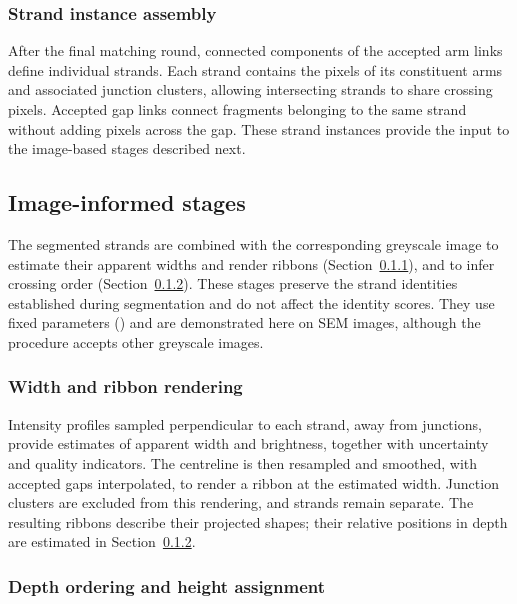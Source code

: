 \subsubsection{Strand instance assembly}
\label{sec:mm-output}

After the final matching round, connected components of the accepted arm
links define individual strands. Each strand contains the pixels of its
constituent arms and associated junction clusters, allowing intersecting
strands to share crossing pixels. Accepted gap links connect fragments
belonging to the same strand without adding pixels across the gap. These
strand instances provide the input to the image-based stages described next.

\subsection{Image-informed stages}
\label{sec:mm-image}

The segmented strands are combined with the corresponding greyscale image
to estimate their apparent widths and render ribbons
(Section~\ref{sec:mm-stage4}), and to infer crossing order
(Section~\ref{sec:mm-depth}).
These stages preserve the strand identities established during segmentation
and do not affect the identity scores. They use fixed parameters
(\supprecon{}) and are demonstrated here on SEM images, although the procedure
accepts other greyscale images.

\subsubsection{Width and ribbon rendering}
\label{sec:mm-stage4}

Intensity profiles sampled perpendicular to each strand, away from junctions,
provide estimates of apparent width and brightness, together with uncertainty
and quality indicators. The centreline is then resampled and smoothed, with
accepted gaps interpolated, to render a ribbon at the estimated width.
Junction clusters are excluded from this rendering, and strands remain
separate. The resulting ribbons describe their projected shapes; their
relative positions in depth are estimated in Section~\ref{sec:mm-depth}.

\subsubsection{Depth ordering and height assignment}
\label{sec:mm-depth}

